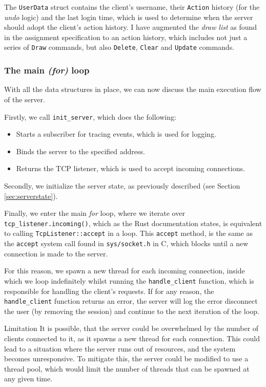 \documentclass{article}
\newcommand{\code}[1]{\texttt{#1}}
\begin{document}
The \code{UserData} struct contains the client's username, their \code{Action}
history (for the \textit{undo} logic) and the last login time, which is used to
determine when the server should adopt the client's action history. I have
augmented the \textit{draw list} as found in the assignment specification to an
action history, which includes not just a series of \code{Draw} commands, but
also \code{Delete}, \code{Clear} and \code{Update} commands.

\newpage

\subsubsection{The main \textit{(for)} loop}

With all the data structures in place, we can now discuss the main execution
flow of the server.

Firstly, we call \code{init\_server}, which does the following:
\begin{itemize}
    \item Starts a subscriber for tracing events, which is used for logging.
    \item Binds the server to the specified address.
    \item Returns the TCP listener, which is used to accept incoming connections.
\end{itemize}

Secondly, we initialize the server state, as previously described (see Section \ref{sec:serverstate}).

Finally, we enter the main \textit{for} loop, where we iterate over
\code{tcp\_listener.incoming()}, which as the Rust documentation states, is
equivalent to calling \code{TcpListener::accept} in a loop. This \code{accept}
method, is the same as the \code{accept} system call found in
\code{sys/socket.h} in C, which blocks until a new connection is made to the
server.

For this reason, we spawn a new thread for each incoming connection, inside
which we loop indefinitely whilst running the \code{handle\_client} function,
which is responsible for handling the client's requests. If for any reason, the
\code{handle\_client} function returns an error, the server will log the error
disconnect the user (by removing the session) and continue to the next iteration
of the loop.

\begin{warningbox}{Limitation}
    It is possible, that the server could be overwhelmed by the number of clients
    connected to it, as it spawns a new thread for each connection. This could
    lead to a situation where the server runs out of resources, and the system
    becomes unresponsive. To mitigate this, the server could be modified to use a
    thread pool, which would limit the number of threads that can be spawned at
    any given time.
\end{warningbox}
\end{document}
